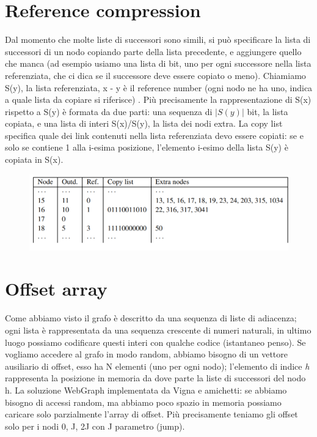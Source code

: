 \documentclass[12pt,italian]{report}
\begin{document}
\section{Reference compression}
\label{reference compression}
Dal momento che molte liste di successori sono simili, si può specificare la lista di successori di un nodo copiando parte della lista precedente, e aggiungere quello che manca (ad esempio usiamo una lista di bit, uno per ogni successore nella lista referenziata, che ci dica se il successore deve essere copiato o meno).
Chiamiamo S(y), la lista referenziata, x - y è il reference number (ogni nodo ne ha uno, indica a quale lista da copiare si riferisce) . Più precisamente la rappresentazione di S(x) rispetto a S(y) è formata da due parti: una sequenza di $|S(y)|$ bit, la lista copiata, e una lista di interi S(x)/S(y), la lista dei nodi extra. La copy list specifica quale dei link contenuti nella lista referenziata devo essere copiati: se e solo se contiene 1 alla i-esima posizione, l'elemento i-esimo della lista S(y) è copiata in S(x).

\begin{figure}[h]
	\centering
	\includegraphics[width=120mm]{image/graphcomp3.png}
	\label{fig:ef1}
\end{figure}

\section{Offset array}
\label{offset}
Come abbiamo visto il grafo è descritto da una sequenza di liste di adiacenza; ogni lista è rappresentata da una sequenza crescente di numeri naturali, in ultimo luogo possiamo codificare questi interi con qualche codice (istantaneo penso). Se vogliamo accedere al grafo in modo random, abbiamo bisogno di un vettore ausiliario di offset, esso ha N elementi (uno per ogni nodo); l'elemento di indice \textit{h} rappresenta la posizione in memoria da dove parte la liste di successori del nodo h. 
La soluzione WebGraph implementata da Vigna e amichetti: se abbiamo bisogno di accessi random, ma abbiamo poco spazio in memoria possiamo caricare solo parzialmente l'array di offset. Più precisamente teniamo gli offset solo per i nodi 0, J, 2J con J parametro (jump). 
\clearpage
\end{document}
